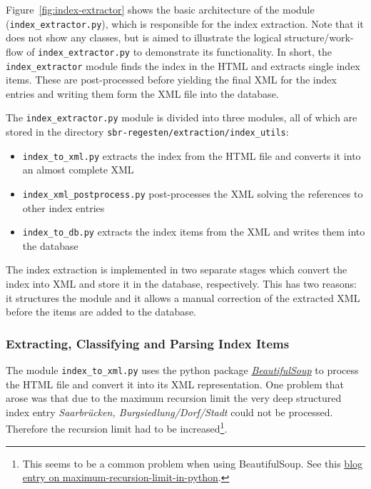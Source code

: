 Figure~\ref{fig:index-extractor} shows the basic architecture of the
module (\texttt{index\_extractor.py}), which is responsible for the
index extraction. Note that it does not show any classes, but is aimed
to illustrate the logical structure/work-flow of
\texttt{index\_extractor.py} to demonstrate its functionality. In
short, the \texttt{index\_extractor} module finds the index in the
HTML and extracts single index items. These are post-processed before
yielding the final XML for the index entries and writing them form the
XML file into the database.

The \texttt{index\_extractor.py} module is divided into three modules,
all of which are stored in the directory
\texttt{sbr-regesten/extraction/index\_utils}:

\begin{itemize}
\item \texttt{index\_to\_xml.py} extracts the index from the HTML file
  and converts it into an almost complete XML
\item \texttt{index\_xml\_postprocess.py} post-processes the XML
  solving the references to other index entries
\item \texttt{index\_to\_db.py} extracts the index items from the XML
  and writes them into the database
\end{itemize}

The index extraction is implemented in two separate stages which
convert the index into XML and store it in the database, respectively.
This has two reasons: it structures the module and it allows a manual
correction of the extracted XML before the items are added to the
database.

\subsubsection{Extracting, Classifying and Parsing Index Items}
The module \texttt{index\_to\_xml.py} uses the python package
\href{http://www.crummy.com/software/BeautifulSoup/bs4/doc/}
{\textit{BeautifulSoup}} to process the HTML file and convert it into
its XML representation. One problem that arose was that due to the
maximum recursion limit the very deep structured index entry
\textit{Saarbrücken, Burgsiedlung/Dorf/Stadt} could not be processed.
Therefore the recursion limit had to be increased\footnote{This seems
  to be a common problem when using BeautifulSoup. See this
  \href{http://blog.pablohoffman.com/maximum-recursion-limit-in-python}{blog
    entry on maximum-recursion-limit-in-python}.}.

